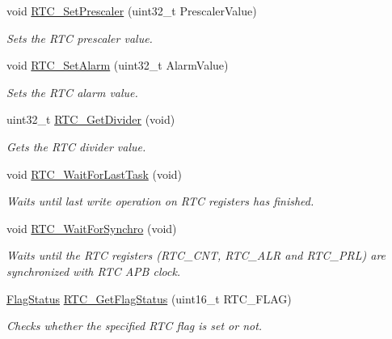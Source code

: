 \begin{DoxyCompactItemize}
void \mbox{\hyperlink{group___r_t_c___private___functions_gaf76be6071d1ba65b009e0791069e602c}{R\+T\+C\+\_\+\+Set\+Prescaler}} (uint32\+\_\+t Prescaler\+Value)
\begin{DoxyCompactList}\small\item\em Sets the R\+TC prescaler value. \end{DoxyCompactList}\item 
void \mbox{\hyperlink{group___r_t_c___private___functions_gaec644c636a30ab5e287ba60ffc77132c}{R\+T\+C\+\_\+\+Set\+Alarm}} (uint32\+\_\+t Alarm\+Value)
\begin{DoxyCompactList}\small\item\em Sets the R\+TC alarm value. \end{DoxyCompactList}\item 
uint32\+\_\+t \mbox{\hyperlink{group___r_t_c___private___functions_gaa4f00e0469fedcf6cbf23760e6d801ed}{R\+T\+C\+\_\+\+Get\+Divider}} (void)
\begin{DoxyCompactList}\small\item\em Gets the R\+TC divider value. \end{DoxyCompactList}\item 
void \mbox{\hyperlink{group___r_t_c___private___functions_gaa0a406ef860d5231748c5f0d82673036}{R\+T\+C\+\_\+\+Wait\+For\+Last\+Task}} (void)
\begin{DoxyCompactList}\small\item\em Waits until last write operation on R\+TC registers has finished. \end{DoxyCompactList}\item 
void \mbox{\hyperlink{group___r_t_c___private___functions_gaca4346e0dc15dccc15179786b28450db}{R\+T\+C\+\_\+\+Wait\+For\+Synchro}} (void)
\begin{DoxyCompactList}\small\item\em Waits until the R\+TC registers (R\+T\+C\+\_\+\+C\+NT, R\+T\+C\+\_\+\+A\+LR and R\+T\+C\+\_\+\+P\+RL) are synchronized with R\+TC A\+PB clock. \end{DoxyCompactList}\item 
\mbox{\hyperlink{group___exported__types_ga89136caac2e14c55151f527ac02daaff}{Flag\+Status}} \mbox{\hyperlink{group___r_t_c___private___functions_ga21a85e5f846cb4552d5e76420779f3f6}{R\+T\+C\+\_\+\+Get\+Flag\+Status}} (uint16\+\_\+t R\+T\+C\+\_\+\+F\+L\+AG)
\begin{DoxyCompactList}\small\item\em Checks whether the specified R\+TC flag is set or not. \end{DoxyCompactList}\item 

\end{DoxyCompactItemize}

